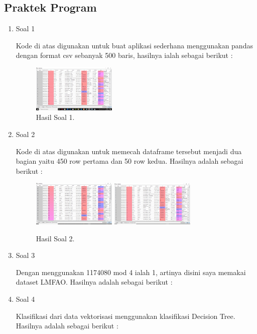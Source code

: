\subsection{Praktek Program}
\begin{enumerate}
	\item Soal 1
	\hfill\break
	
	Kode di atas digunakan untuk buat aplikasi sederhana menggunakan pandas dengan format csv sebanyak 500 baris, hasilnya ialah sebagai berikut : 
	\begin{figure}[H]
	\centering
		\includegraphics[width=4cm]{figures/1174080/4/hasil1.PNG}
		\caption{Hasil Soal 1.}
	\end{figure}

	\item Soal 2
	\hfill\break
	
	Kode di atas digunakan untuk memecah dataframe tersebut menjadi dua bagian yaitu 450 row pertama dan 50 row kedua. Hasilnya adalah sebagai berikut :
	\begin{figure}[H]
	\centering
		\includegraphics[width=4cm]{figures/1174080/4/hasil21.PNG}
		\includegraphics[width=4cm]{figures/1174080/4/hasil22.PNG}
		\caption{Hasil Soal 2.}
	\end{figure}
	
	\item Soal 3
	\hfill\break
	
	Dengan menggunakan 1174080 mod 4 ialah 1, artinya disini saya memakai dataset LMFAO. Hasilnya adalah sebagai berikut :

	\item Soal 4
	\hfill\break
	
	Klasifikasi dari data vektorisasi menggunakan klasifikasi Decision Tree. Hasilnya adalah sebagai berikut :
	


\end{enumerate}
